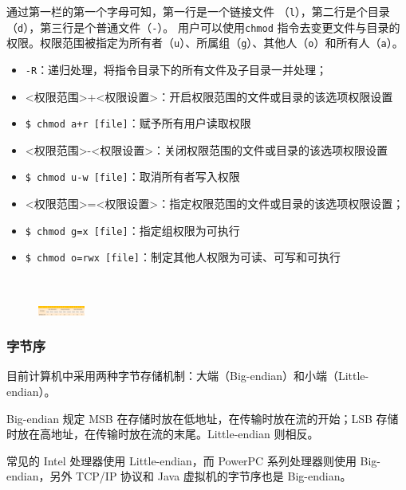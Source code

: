 \indent 通过第一栏的第一个字母可知，第一行是一个链接文件 （\verb+l+），第二行是个目录（\verb+d+），第三行是个普通文件（\verb+-+）。
\indent 用户可以使用\verb+chmod+ 指令去变更文件与目录的权限。权限范围被指定为所有者（\verb+u+）、所属组（\verb+g+）、其他人（\verb+o+）和所有人（\verb+a+）。
\begin{itemize}
    \item \verb+-R+：递归处理，将指令目录下的所有文件及子目录一并处理；
    \item <权限范围>+<权限设置>：开启权限范围的文件或目录的该选项权限设置
    \item \verb|$ chmod a+r [file]|：赋予所有用户读取权限
    \item <权限范围>-<权限设置>：关闭权限范围的文件或目录的该选项权限设置
    \item \verb+$ chmod u-w [file]+：取消所有者写入权限
    \item <权限范围>=<权限设置>：指定权限范围的文件或目录的该选项权限设置；
    \item \verb+$ chmod g=x [file]+：指定组权限为可执行
    \item \verb+$ chmod o=rwx [file]+：制定其他人权限为可读、可写和可执行
\end{itemize}
\indent     \\
\indent 
\begin{figure}[ht]
\includegraphics[width=0.6in]{images/content/1.3_file.png}
\label{fig:文件描述符}
\end{figure}

\subsubsection{字节序}
\indent \setlength{\parindent}{2em}

\indent 目前计算机中采用两种字节存储机制：大端（Big-endian）和小端（Little-endian）。

\indent Big-endian 规定 MSB 在存储时放在低地址，在传输时放在流的开始；LSB 存储时放在高地址，在传输时放在流的末尾。Little-endian 则相反。

\indent 常见的 Intel 处理器使用 Little-endian，而 PowerPC 系列处理器则使用 Big-endian，另外 TCP/IP 协议和 Java 虚拟机的字节序也是 Big-endian。

